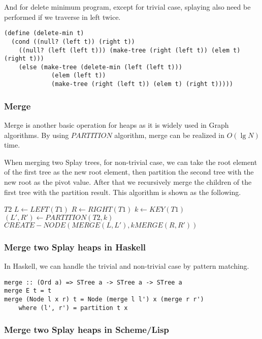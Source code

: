 \documentclass{article}
\begin{document}
And for delete minimum program, except for trivial case, splaying also
need be performed if we traverse in left twice.

\begin{lstlisting}
(define (delete-min t)
  (cond ((null? (left t)) (right t))
	((null? (left (left t))) (make-tree (right (left t)) (elem t) (right t)))
	(else (make-tree (delete-min (left (left t)))
			 (elem (left t))
			 (make-tree (right (left t)) (elem t) (right t)))))
\end{lstlisting}

\subsubsection{Merge}
Merge is another basic operation for heaps as it is widely used in Graph algorithms. By using $PARTITION$ algorithm, merge can be realized in $O(\lg N)$ time.

When merging two Splay trees, for non-trivial case, we can take the root element of the first tree as the new root element, then partition the second tree with the new root as the pivot value. After that we recursively merge
the children of the first tree with the partition result. This algorithm is shown as the following.

\begin{algorithmic}[1]
    \State \Return $T2$
  \Else
    \State $L \gets LEFT(T1)$
    \State $R \gets RIGHT(T1)$
    \State $k \gets KEY(T1)$
    \State $(L', R') \gets PARTITION(T2, k)$
    \State \Return $CREATE-NODE(MERGE(L, L'), k MERGE(R, R'))$
  \EndIf
\EndFunction
\end{algorithmic}

\subsubsection*{Merge two Splay heaps in Haskell}
In Haskell, we can handle the trivial and non-trivial case by pattern matching.

\lstset{language=Haskell}
\begin{lstlisting}
merge :: (Ord a) => STree a -> STree a -> STree a
merge E t = t
merge (Node l x r) t = Node (merge l l') x (merge r r')
    where (l', r') = partition t x
\end{lstlisting}

\subsubsection*{Merge two Splay heaps in Scheme/Lisp}
\end{document}
